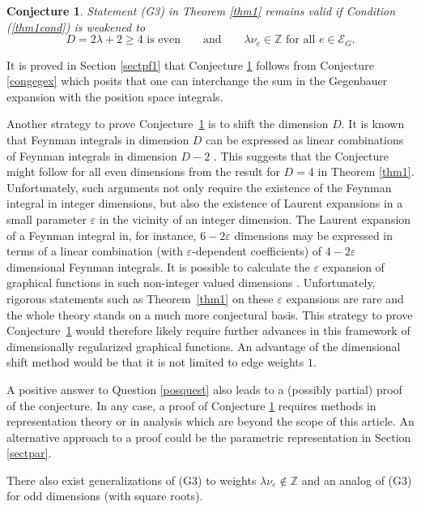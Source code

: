 \documentclass[oneside]{amsart}
\newcommand{\ZZ}{{\mathbb Z}}
\newcommand{\sE}{\mathcal{E}}
\theoremstyle{plain}
\newtheorem{con}[thm]{Conjecture}
\begin{document}
\begin{con}\label{con1}
Statement (G3) in Theorem \ref{thm1} remains valid if Condition (\ref{thm1cond}) is weakened to
$$
D=2\lambda+2\geq4\text{ is even}\qquad\text{and}\qquad\lambda\nu_e\in\ZZ\text{ for all }e\in\sE_G.
$$
\end{con}
It is proved in Section \ref{sectpf1} that Conjecture \ref{con1} follows from Conjecture \ref{congegex} which posits that one can interchange
the sum in the Gegenbauer expansion with the position space integrals.

Another strategy to prove Conjecture~\ref{con1} is to shift the dimension $D$. It is known that Feynman integrals in dimension $D$ can be expressed as linear combinations of Feynman integrals
in dimension $D-2$ \cite{Tarasov,Lee:2009dh}. This suggests that the Conjecture might follow for all even dimensions from the result for $D=4$ in Theorem \ref{thm1}.
Unfortunately, such arguments not only require the existence of the Feynman integral in integer dimensions, but also the existence of Laurent expansions in a small parameter $\varepsilon$ in
the vicinity of an integer dimension. The Laurent expansion of a Feynman integral in, for instance, $6-2\varepsilon$ dimensions may be expressed in terms of a linear combination
(with $\varepsilon$-dependent coefficients) of $4-2\varepsilon$ dimensional Feynman integrals. It is possible to calculate the $\varepsilon$ expansion of graphical functions in such
non-integer valued dimensions \cite{numfunct,7loops}. Unfortunately, rigorous statements such as Theorem~\ref{thm1} on these $\varepsilon$ expansions are rare and the whole theory stands
on a much more conjectural basis. This strategy to prove Conjecture~\ref{con1} would therefore likely require further advances in this framework of dimensionally regularized graphical functions.
An advantage of the dimensional shift method would be that it is not limited to edge weights $1$.

A positive answer to Question \ref{posquest} also leads to a (possibly partial) proof of the conjecture.
In any case, a proof of Conjecture \ref{con1} requires methods in representation theory or in analysis which are beyond the scope of this article.
An alternative approach to a proof could be the parametric representation in Section \ref{sectpar}.

There also exist generalizations of (G3) to weights $\lambda\nu_e\notin\ZZ$ and an analog of (G3) for odd dimensions (with square roots).
\end{document}
